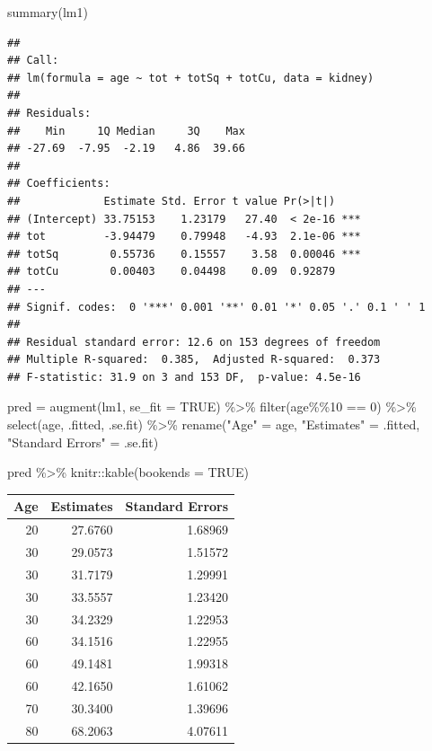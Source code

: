 \documentclass[
]{article}
\newenvironment{Shaded}{\begin{snugshade}}{\end{snugshade}}
\newcommand{\AttributeTok}[1]{\textcolor[rgb]{0.77,0.63,0.00}{#1}}
\newcommand{\ConstantTok}[1]{\textcolor[rgb]{0.00,0.00,0.00}{#1}}
\newcommand{\DecValTok}[1]{\textcolor[rgb]{0.00,0.00,0.81}{#1}}
\newcommand{\FunctionTok}[1]{\textcolor[rgb]{0.00,0.00,0.00}{#1}}
\newcommand{\NormalTok}[1]{#1}
\newcommand{\OtherTok}[1]{\textcolor[rgb]{0.56,0.35,0.01}{#1}}
\newcommand{\SpecialCharTok}[1]{\textcolor[rgb]{0.00,0.00,0.00}{#1}}
\newcommand{\StringTok}[1]{\textcolor[rgb]{0.31,0.60,0.02}{#1}}
\begin{document}
\begin{Shaded}
\begin{Highlighting}[]
\FunctionTok{summary}\NormalTok{(lm1)}
\end{Highlighting}
\end{Shaded}

\begin{verbatim}
## 
## Call:
## lm(formula = age ~ tot + totSq + totCu, data = kidney)
## 
## Residuals:
##    Min     1Q Median     3Q    Max 
## -27.69  -7.95  -2.19   4.86  39.66 
## 
## Coefficients:
##             Estimate Std. Error t value Pr(>|t|)    
## (Intercept) 33.75153    1.23179   27.40  < 2e-16 ***
## tot         -3.94479    0.79948   -4.93  2.1e-06 ***
## totSq        0.55736    0.15557    3.58  0.00046 ***
## totCu        0.00403    0.04498    0.09  0.92879    
## ---
## Signif. codes:  0 '***' 0.001 '**' 0.01 '*' 0.05 '.' 0.1 ' ' 1
## 
## Residual standard error: 12.6 on 153 degrees of freedom
## Multiple R-squared:  0.385,  Adjusted R-squared:  0.373 
## F-statistic: 31.9 on 3 and 153 DF,  p-value: 4.5e-16
\end{verbatim}

\begin{Shaded}
\begin{Highlighting}[]
\NormalTok{pred }\OtherTok{=} \FunctionTok{augment}\NormalTok{(lm1, }\AttributeTok{se\_fit =} \ConstantTok{TRUE}\NormalTok{) }\SpecialCharTok{\%\textgreater{}\%}
  \FunctionTok{filter}\NormalTok{(age}\SpecialCharTok{\%\%}\DecValTok{10} \SpecialCharTok{==} \DecValTok{0}\NormalTok{) }\SpecialCharTok{\%\textgreater{}\%}
  \FunctionTok{select}\NormalTok{(age, .fitted, .se.fit) }\SpecialCharTok{\%\textgreater{}\%}
  \FunctionTok{rename}\NormalTok{(}\StringTok{"Age"} \OtherTok{=}\NormalTok{ age, }\StringTok{"Estimates"} \OtherTok{=}\NormalTok{ .fitted, }\StringTok{"Standard Errors"} \OtherTok{=}\NormalTok{ .se.fit)}

\NormalTok{ pred }\SpecialCharTok{\%\textgreater{}\%}\NormalTok{ knitr}\SpecialCharTok{::}\FunctionTok{kable}\NormalTok{(}\AttributeTok{bookends =} \ConstantTok{TRUE}\NormalTok{)}
\end{Highlighting}
\end{Shaded}

\begin{longtable}[]{@{}rrr@{}}
\toprule()
Age & Estimates & Standard Errors \\
\midrule()
\endhead
20 & 27.6760 & 1.68969 \\
30 & 29.0573 & 1.51572 \\
30 & 31.7179 & 1.29991 \\
30 & 33.5557 & 1.23420 \\
30 & 34.2329 & 1.22953 \\
60 & 34.1516 & 1.22955 \\
60 & 49.1481 & 1.99318 \\
60 & 42.1650 & 1.61062 \\
70 & 30.3400 & 1.39696 \\
80 & 68.2063 & 4.07611 \\
\bottomrule()
\end{longtable}
\end{document}
